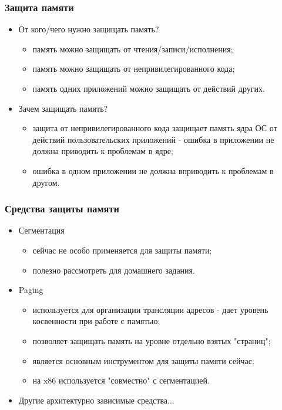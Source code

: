 \begin{frame}
\frametitle{Защита памяти}
\begin{itemize}
  \item От кого/чего нужно защищать память?
  \begin{itemize}
    \item память можно защищать от чтения/записи/исполнения;
    \item память можно защищать от непривилегированного кода;
    \item память одних приложений можно защищать от действий других.
  \end{itemize}
  \item Зачем защищать память?
  \begin{itemize}
    \item защита от непривилегированного кода защищает память ядра ОС от
    действий пользовательских приложений - ошибка в приложении не должна
    приводить к проблемам в ядре;
    \item ошибка в одном приложении не должна вприводить к проблемам в другом.
  \end{itemize}
\end{itemize}
\end{frame}

\begin{frame}
\frametitle{Средства защиты памяти}
\begin{itemize}
  \item Сегментация
  \begin{itemize}
    \item сейчас не особо применяется для защиты памяти;
    \item полезно рассмотреть для домашнего задания.
  \end{itemize}
  \item Paging
  \begin{itemize}
    \item используется для организации трансляции адресов - дает уровень
    косвенности при работе с памятью;
    \item позволяет защищать память на уровне отдельно взятых "страниц";
    \item является основным инструментом для защиты памяти сейчас;
    \item на x86 используется "совместно" с сегментацией.
  \end{itemize}
  \item Другие архитектурно зависимые средства...
\end{itemize}
\end{frame}


